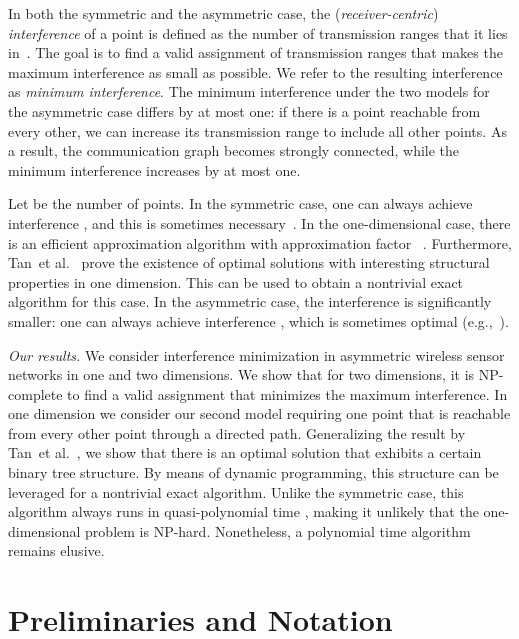 \documentclass[envcountsect,envcountsame,runningheads,a4paper]{llncs}
\renewcommand{\paragraph}[1]{\smallskip\noindent\textit{#1}}
\begin{document}
In both the symmetric and the asymmetric case, the
(\emph{receiver-centric}) \emph{interference}
of a point is defined as the number of transmission
ranges that it lies in~\cite{RickenbachWaZo09}. The goal is to find a
valid assignment of transmission ranges that makes the maximum interference
as small as possible. We refer to the resulting interference as \emph{minimum interference}.
The minimum interference under the two models for the 
asymmetric case differs by at most one: if there is a point reachable 
from every other, we can increase its transmission range to 
include all other points. As a result, the communication 
graph becomes strongly connected, while the minimum 
interference increases by at most one.

Let  be the number of points.
In the symmetric case,
one can always achieve interference
, and this is sometimes necessary~\cite{HalldorssonTo08,
RickenbachWaZo09}. In the one-dimensional case, there is an
efficient approximation algorithm with
approximation factor ~\cite{RickenbachWaZo09}.
Furthermore,
Tan~et al.~\cite{TanLoWaHuLa11}
prove the existence of optimal solutions
with interesting structural properties in one dimension.
This can be used to obtain a nontrivial exact algorithm for
this case.
In the asymmetric case, the interference is significantly smaller:
one can always achieve interference , which is sometimes
optimal (e.g.,~\cite{Korman12}).

\paragraph{Our results.}
We consider interference minimization in asymmetric wireless
sensor networks in one and two dimensions. We show that for
two dimensions, it is NP-complete to find a valid
assignment that minimizes the maximum interference.
In one dimension we consider our second model requiring
one point that is reachable from
every other point through a directed path.
 Generalizing the
result by Tan~et al.~\cite{TanLoWaHuLa11}, we show that
there is an optimal solution that
exhibits a certain binary tree structure. By means of
dynamic programming, this structure can
be leveraged for a nontrivial exact algorithm. Unlike the
symmetric case, this algorithm always runs in quasi-polynomial
time , making it unlikely that the
one-dimensional problem is NP-hard.
Nonetheless, a polynomial time algorithm remains elusive.


\section{Preliminaries and Notation}
\end{document}

